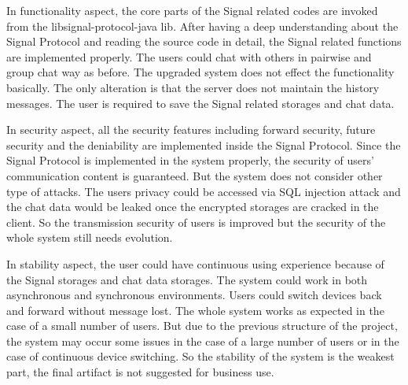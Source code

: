In functionality aspect, the core parts of the Signal related codes are invoked from the libsignal-protocol-java lib. After having a deep understanding about the Signal Protocol and reading the source code in detail, the Signal related functions are implemented properly. The users could chat with others in pairwise and group chat way as before. The upgraded system does not effect the functionality basically. The only alteration is that the server does not maintain the history messages. The user is required to save the Signal related storages and chat data.

In security aspect, all the security features including forward security, future security and the deniability are implemented inside the Signal Protocol. Since the Signal Protocol is implemented in the system properly, the security of users' communication content is guaranteed. But the system does not consider other type of attacks. The users privacy could be accessed via SQL injection attack and the chat data would be leaked once the encrypted storages are cracked in the client. So the transmission security of users is improved but the security of the whole system still needs evolution.

In stability aspect, the user could have continuous using experience because of the Signal storages and chat data storages. The system could work in both asynchronous and synchronous environments. Users could switch devices back and forward without message lost. The whole system works as expected in the case of a small number of users. But due to the previous structure of the project, the system may occur some issues in the case of a large number of users or in the case of continuous device switching. So the stability of the system is the weakest part, the final artifact is not suggested for business use. 

\clearpage